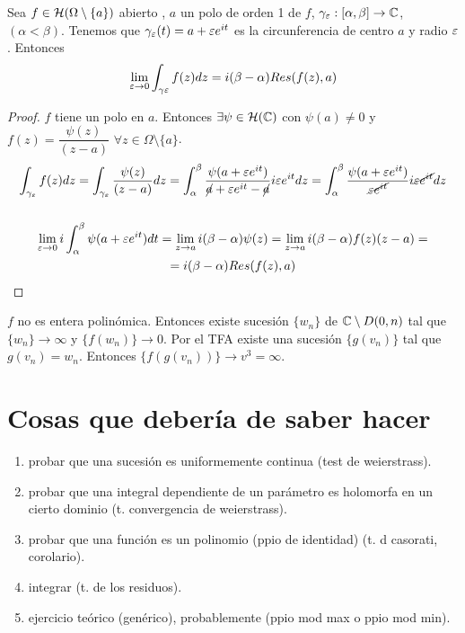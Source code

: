 \documentclass[12pt]{article}
\begin{document}
\begin{ejercicio}
        \begin{prop}
            Sea $ f \in \mathcal{H}( \Omega \setminus \{a\})$ abierto , $a$ un polo de orden 1 de $f$, $\gamma_\varepsilon: [\alpha, \beta] \to \mathbb{C}$, $(\alpha<\beta)$. Tenemos que $\gamma_\varepsilon(t) = a + \varepsilon e^{it}$ es la circunferencia de centro $a$ y radio $\varepsilon$. Entonces
            \begin{gather*}
                \lim\limits_{\varepsilon\to 0} \int_{\gamma\varepsilon} f(z) dz = i(\beta-\alpha) Res(f(z),a)
            \end{gather*}
            \begin{proof}
                $f$ tiene un polo en $a$. Entonces $\exists \psi\in \mathcal{H}(\mathbb{C})$ con $\psi(a) \neq 0$ y $f(z)=\dfrac{\psi(z)}{(z-a)}$ $\forall z \in \Omega \setminus \{a\}$.
                \begin{gather*}
                    \int_{\gamma_\varepsilon} f(z) dz = \int_{\gamma_\varepsilon} \frac{\psi(z)}{(z-a)} dz = \int_\alpha^\beta \frac{\psi(a+ \varepsilon e^{it})}{\cancel{a} + \varepsilon e^{it}-\cancel{a}}i\varepsilon e^{it} dz = \int_\alpha^\beta \frac{\psi(a+ \varepsilon e^{it})}{\cancel{\varepsilon e^{it}}}i\cancel{\varepsilon e^{it}} dz\\\\
                    \lim_{\varepsilon \to 0} i\int_\alpha^\beta \psi(a+\varepsilon e^{it}) dt = \lim_{z\to a} i(\beta - \alpha) \psi(z) = \lim_{z\to a } i(\beta - \alpha) f(z) (z-a) =\\= i(\beta - \alpha) Res(f(z),a)
                \end{gather*}
            \end{proof}
        \end{prop}

    \end{ejercicio}
    

    $f$ no es entera polinómica. Entonces existe sucesión $\{w_n\}$ de $\mathbb{C}\setminus D(0,n)$ tal que $\{w_n\}\to \infty$ y $\{f(w_n)\}\to 0$. Por el TFA existe una sucesión $\{g(v_n)\}$ tal que $g(v_n)=w_n$. Entonces $\{f(g(v_n))\} \to v^3 = \infty$.

    \newpage

    \section{Cosas que debería de saber hacer}
    \begin{enumerate}
        \item probar que una sucesión es uniformemente continua (test de weierstrass).
        \item probar que una integral dependiente de un parámetro es holomorfa en un cierto dominio (t. convergencia de weierstrass).
        \item probar que una función es un polinomio (ppio de identidad) (t. d casorati, corolario).
        \item integrar (t. de los residuos).
        \item ejercicio teórico (genérico), probablemente (ppio mod max o ppio mod min).
    \end{enumerate}
\end{document}
